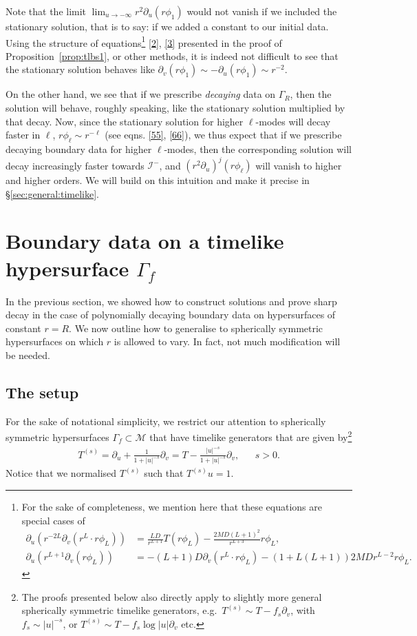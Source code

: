 \documentclass[11pt,english]{article}
\numberwithin{equation}{section}
\theoremstyle{remark}
\theoremstyle{plain}
\theoremstyle{remark}
\newcommand{\pu}{\partial_u}
\newcommand{\pv}{\partial_v}
\renewcommand{\(}{\left(}
\renewcommand{\)}{\right)}
\begin{document}
Note that the limit $\lim_{u\to-\infty} r^2\pu(r\phi_1)$ would not vanish if we included the stationary solution, that is to say: if we added a constant to our initial data. Using the structure of equations\footnote{For the sake of completeness, we mention here that these equations are special cases of \begin{align}\label{55}
\pu(r^{-2L}\pv(r^L\cdot r\phi_L))&=\frac{LD}{r^{L+1}}T(r\phi_L)-\frac{2MD(L+1)^2}{r^{L+3}}r\phi_L,\\
\pu(r^{L+1}\pv(r\phi_L))&=-(L+1)D\pv(r^L\cdot r\phi_L)-(1+L(L+1))2MD r^{L-2}r\phi_L.\label{66}
\end{align}
} \eqref{2}, \eqref{3} presented in the proof of Proposition~\ref{prop:tlbs1}, or other methods, it is indeed not difficult to see that the stationary solution behaves like $\pv(r\phi_1)\sim -\pu(r\phi_1)\sim r^{-2}$. 

On the other hand, we see that if we prescribe \textit{decaying} data on $\Gamma_R$, then the solution will behave, roughly speaking, like the stationary solution multiplied by that decay.
Now, since the stationary solution for higher $\ell$-modes will decay faster in $\ell$, $r\phi_\ell\sim r^{-\ell}$ (see eqns. \eqref{55}, \eqref{66}), we thus expect that if we prescribe decaying boundary data for higher $\ell$-modes, then the corresponding solution will decay increasingly faster towards $\mathcal{I}^-$, and $(r^2\pu)^j(r\phi_\ell)$ will vanish to higher and higher orders. 
We will build on this intuition and make it precise in \S\ref{sec:general:timelike}. 

\newpage
\section{Boundary data on a timelike hypersurface \texorpdfstring{$\Gamma_f$}{Gamma-f}}\label{sec:timelikenonconstantr}
In the previous section, we showed how to construct solutions and prove sharp decay in the case of polynomially decaying boundary data on hypersurfaces of constant $r=R$. We now outline how to generalise to spherically symmetric hypersurfaces on which $r$ is allowed to vary. In fact, not much modification will be needed.
\newcommand{\te}{T^{(s)}}
\subsection{The setup}\label{sec:tf:setup}
For the sake of notational simplicity, we restrict our attention to spherically symmetric hypersurfaces $\Gamma_{f}\subset\mathcal M$ that have timelike generators  that are given by\footnote{The proofs presented below also directly apply to slightly more general spherically symmetric timelike generators, e.g.\ $\te \sim T-f_s\partial_v$, with $f_s\sim |u|^{-s}$, or $\te \sim T-f_s\log|u|\partial_v$ etc.}
\begin{align}
\te=\pu+\frac{1}{1+|u|^{-s}}\pv=T-\frac{|u|^{-s}}{1+|u|^{-s}}\pv,&&s>0.
\end{align}
Notice that we normalised $\te$ such that $\te u=1$.
\end{document}
